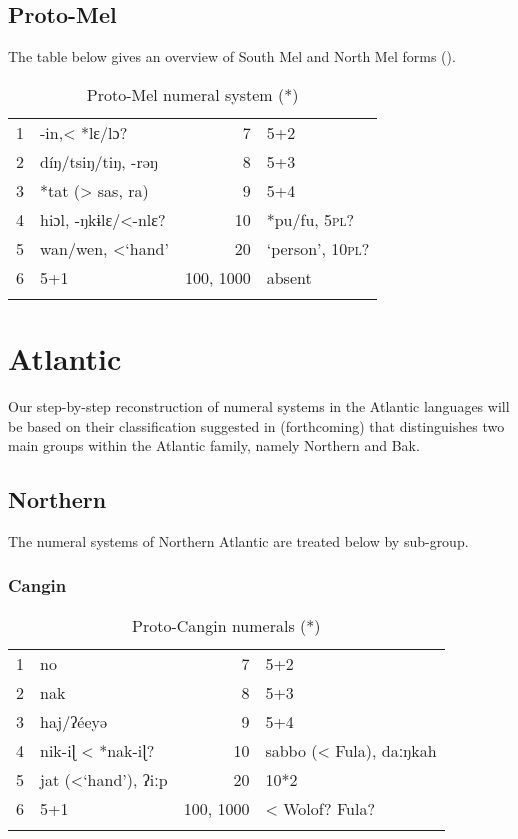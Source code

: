 \clearpage
\subsection{Proto-Mel}%
The table below gives an overview of South Mel and North Mel forms ().

\begin{table}
\caption{\label{tab:3:219}Proto-Mel numeral system (*)}


\begin{tabularx}{\textwidth}{lQrQ}
\lsptoprule

1 & -in,< *lɛ/lɔ? & 7 & 5+2\\
2 & díŋ/tsiŋ/tiŋ, -rəŋ & 8 & 5+3\\
3 & *tat (> sas, ra) & 9 & 5+4\\
4 & hiɔl, -ŋkɨlɛ/<-nlɛ? & 10 & *pu/fu, 5\textsc{pl}? \\
5 & wan/wen, <‘hand’ & 20 & ‘person’, 10\textsc{pl}? \\
6 & 5+1 &  {100,} 1000 & absent\\
\lspbottomrule
\end{tabularx}

\end{table}
\section{Atlantic}%

Our step-by-step reconstruction of numeral systems in the Atlantic languages will be based on their classification suggested in \citealt{PozdniakovSegerer2017} (forthcoming) that distinguishes two main groups within the Atlantic family, namely Northern and Bak.


\subsection{Northern}%
The numeral systems of Northern Atlantic are treated below by sub-group.

\subsubsection{Cangin} %
\begin{table}
\caption{\label{tab:3:220}Proto-Cangin numerals (*)}


\begin{tabularx}{\textwidth}{lQrQ}
\lsptoprule

1 & no & 7 & 5+2\\
2 & nak & 8 & 5+3\\
3 & haj/ʔéeyə & 9 & 5+4\\
4 & nik-iɭ < *nak-iɭ? & 10 & sabbo (< Fula), daːŋkah\\
5 & jat (<`hand'), ʔiːp & 20 & 10*2\\
6 & 5+1 & 100, 1000 & < Wolof? Fula?\\
\lspbottomrule
\end{tabularx}
\end{table}

